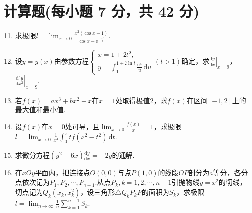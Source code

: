 \documentclass[../Main.tex]{subfiles}
\begin{document}
\section{计算题(每小题 7 分，共 42 分)}
\begin{enumerate}
    \setcounter{enumi}{10}
    \item 求极限$l=\lim_{x\to0}\frac{x^{2}(\cos x-1)}{\cos x-\mathrm{e}^{-\frac{x^2}{2}}}$.
          \vspace{10em}

    \item 设$y=y(x)$由参数方程$\begin{cases}
                  x=1+2t^{2}, \\
                  y=\int_{1}^{1+2\ln t}\frac{\mathrm{e}^u}{u}\,\mathrm{d}u
              \end{cases}(t>1)$确定，求$\left.\frac{\mathrm{d}y}{\mathrm{d}x}\right|_{x=9}$，$\left
              .\frac{\mathrm{d}^{2}y}{\mathrm{d}x^{2}}\right|_{x=9}$.
          \vspace{10em}

    \item 若$f(x)=ax^{3}+bx^{2}+x$在$x=1$处取得极值$2$，求$f(x)$在区间$[-1,2
              ]$上的最大值和最小值.
          \vspace{10em}

    \item 设$f(x)$在$x=0$处可导，且$\lim_{x\to0}\frac{f(x)}{x}=1$，求极限$l=
              \lim_{x\to0}\frac{1}{x^{4}}\int_{0}^{x}tf(x^{2}-t^{2})\,\mathrm{d}t$.
          \vspace{10em}

    \item 求微分方程$(y^{2}-6x)\frac{\mathrm{d}y}{\mathrm{d}x}=-2y$的通解.
          \vspace{11em}

    \item 在$xOy$平面内，把连接点$O(0,0)$与点$P(1,0)$的线段$OP$剖分为$n$等分，各分点依次记为$P
                  _{1},P_{2},\cdots,P_{n-1}$.从点$P_{k},k=1,2,\cdots,n-1$引抛物线$y=x^{2}$的切线，切点记为$Q
                  _{k}(x_{k},x_{k}^{2})$，设三角形$\triangle Q_{k}P_{k}P$的面积为$S_{k}$，求极限$l
              =\lim_{n\to\infty}\frac{1}{n}\sum_{k=1}^{n-1}S_{k}$.
          \vspace{12em}
\end{enumerate}
\end{document}
